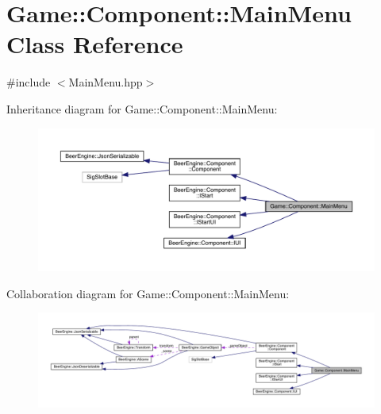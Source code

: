 \hypertarget{class_game_1_1_component_1_1_main_menu}{}\section{Game\+:\+:Component\+:\+:Main\+Menu Class Reference}
\label{class_game_1_1_component_1_1_main_menu}


{\ttfamily \#include $<$Main\+Menu.\+hpp$>$}



Inheritance diagram for Game\+:\+:Component\+:\+:Main\+Menu\+:
\nopagebreak
\begin{figure}[H]
\begin{center}
\leavevmode
\includegraphics[width=350pt]{class_game_1_1_component_1_1_main_menu__inherit__graph}
\end{center}
\end{figure}


Collaboration diagram for Game\+:\+:Component\+:\+:Main\+Menu\+:
\nopagebreak
\begin{figure}[H]
\begin{center}
\leavevmode
\includegraphics[width=350pt]{class_game_1_1_component_1_1_main_menu__coll__graph}
\end{center}
\end{figure}
